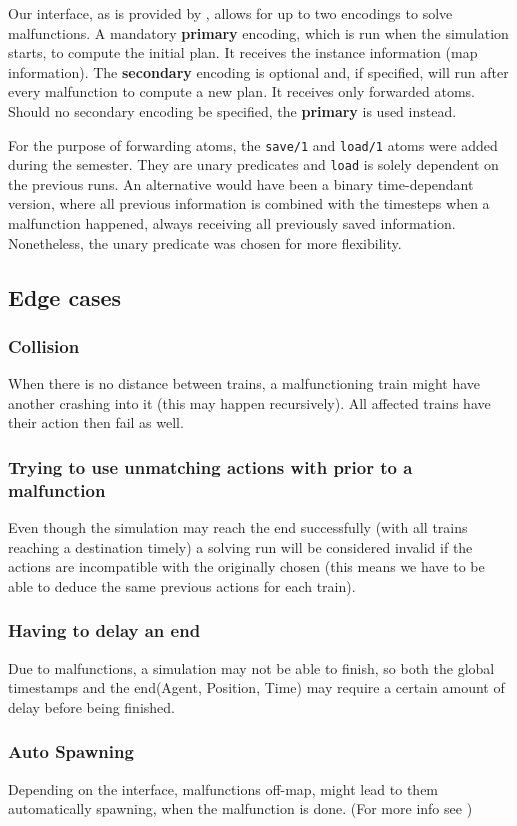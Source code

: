 Our interface, as is provided by \cite{flatland}, allows for up to two encodings to solve malfunctions. A mandatory \textbf{primary} encoding, which is run when the simulation starts, to compute the initial plan. It receives the instance information (map information). The \textbf{secondary} encoding is optional and, if specified, will run after every malfunction to compute a new plan. It receives only forwarded atoms. Should no secondary encoding be specified, the \textbf{primary} is used instead.

For the purpose of forwarding atoms, the \texttt{save/1} and \texttt{load/1} atoms were added during the semester\cite{malfunction_branch}. They are unary predicates and \texttt{load} is solely dependent on the previous runs. An alternative would have been a binary time-dependant version, where all previous information is combined with the timesteps when a malfunction happened, always receiving all previously saved information. Nonetheless, the unary predicate was chosen for more flexibility.

\subsection{Edge cases}

\subsubsection {Collision} When there is no distance between trains, a malfunctioning train might have another crashing into it (this may happen recursively). All affected trains have their action  then fail as well.

\subsubsection {Trying to use unmatching actions with prior to a malfunction} Even though the simulation may reach the end successfully (with all trains reaching a destination timely) a solving run will be considered invalid if the actions are incompatible with the originally chosen (this means we have to be able to deduce the same previous actions for each train).

\subsubsection {Having to delay an end} Due to malfunctions, a simulation may not be able to finish, so both the global timestamps and the end(Agent, Position, Time) may require a certain amount of delay before being finished.

\subsubsection {Auto Spawning} Depending on the interface, malfunctions off-map, might lead to them automatically spawning, when the malfunction is done. (For more info see \cite{malfunction_issue})


